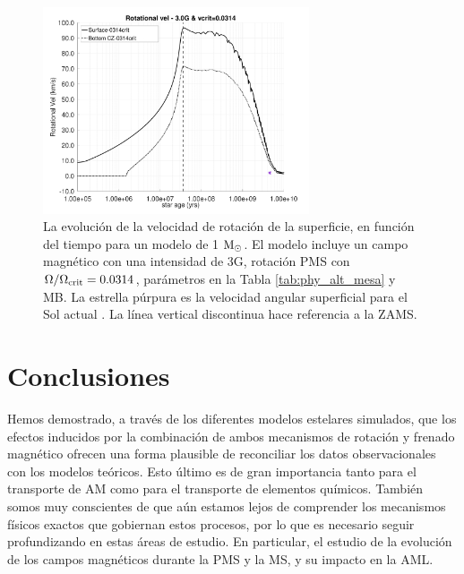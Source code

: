 \begin{figure}
    \centering
    \includegraphics[width=0.7\textwidth]{img/paper1/rot_vel_3_0g_0314vc.pdf}
	\caption{La evolución de la velocidad de rotación de la superficie, en función del tiempo para un modelo de 1 $\mathrm{M}_\odot$. El modelo incluye un campo magnético con una intensidad de 3G, rotación PMS con $\Omega / \Omega_{\mathrm{crit}}=0.0314$, parámetros en la Tabla \ref{tab:phy_alt_mesa} y MB. La estrella púrpura es la velocidad angular superficial para el Sol actual \cite{Gill2012}. La línea vertical discontinua hace referencia a la ZAMS.}
	\label{fig:rot_vel_var_vel_mlt_3_0g}
\end{figure}

\section{Conclusiones} \label{sec_conclusions}
Hemos demostrado, a través de los diferentes modelos estelares simulados, que los efectos inducidos por la combinación de ambos mecanismos de rotación y frenado magnético ofrecen una forma plausible de reconciliar los datos observacionales con los modelos teóricos. Esto último es de gran importancia tanto para el transporte de AM como para el transporte de elementos químicos. También somos muy conscientes de que aún estamos lejos de comprender los mecanismos físicos exactos que gobiernan estos procesos, por lo que es necesario seguir profundizando en estas áreas de estudio. En particular, el estudio de la evolución de los campos magnéticos durante la PMS y la MS, y su impacto en la AML. \par

